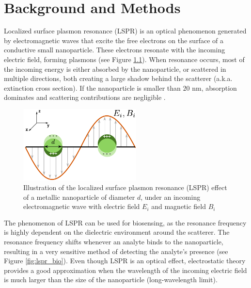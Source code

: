 
\chapter{Background and Methods} \label{chap:methods}
\graphicspath{{background_methods/figs/}}


Localized surface plasmon resonance (LSPR) is an optical phenomenon generated by electromagnetic waves 
that excite the free electrons on the surface of a conductive small nanoparticle. These electrons resonate  
with the incoming electric field, forming plasmons (see Figure \ref{fig:lspr}). When resonance occurs, 
most of the incoming energy is either absorbed by the nanoparticle, or scattered in multiple directions, both
creating a large shadow behind the scatterer (a.k.a. extinction cross section). If the nanoparticle is 
smaller than $20$ nm, absorption dominates and scattering contributions are negligible \cite{PetryayevaKrull2011, OlsonETal2015}.

\begin{figure}[h]
   \centering
     \includegraphics[width=0.55\textwidth]{lspr.pdf} 
     \caption{Illustration of the localized surface plasmon resonance (LSPR) effect of a metallic nanoparticle of diameter $d$, 
     under an incoming electromagnetic wave with electric field $E_i$ and magnetic field $B_i$}
     \label{fig:lspr}
\end{figure}

The phenomenon of LSPR can be used for biosensing, as the resonance frequency is highly dependent on the dielectric environment 
around the scatterer. The resonance frequency shifts whenever an analyte binds to the nanoparticle, 
resulting in a very sensitive method of detecting the analyte's presence \cite{HaesVanduyne2002,HaesETal2004}
(see Figure \ref{fig:lspr_bio}). Even though LSPR is an optical effect, electrostatic theory
provides a good approximation when the wavelength of the incoming electric field is much larger than 
the size of the nanoparticle (long-wavelength limit). 

